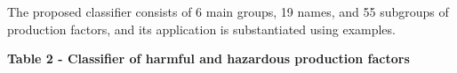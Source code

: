 {%
% 
% 
% 

The proposed classifier consists of 6 main groups, 19 names, and 55
subgroups of production factors, and its application is substantiated
using examples.

{\bfseries Table 2 - Classifier of harmful and hazardous production
factors}

}
